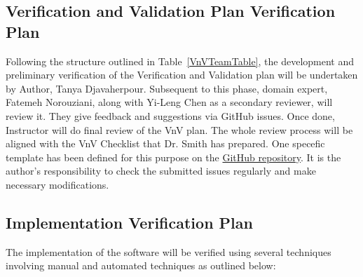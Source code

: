 \documentclass[12pt, titlepage]{article}
\begin{document}



\subsection{Verification and Validation Plan Verification Plan}\label{VnvVerPlan}

Following the structure outlined in Table~\ref{VnVTeamTable}, the development and preliminary verification of 
the Verification and Validation plan will be undertaken by Author, Tanya Djavaherpour. 
Subsequent to this phase, domain expert, Fatemeh Norouziani, along with 
Yi-Leng Chen as a secondary reviewer, will review it. 
They give feedback and suggestions via GitHub issues. 
Once done, Instructor will do final review of the VnV plan.
The whole review process will be aligned with the 
VnV Checklist \citep{VnV-Checklist} that Dr. Smith has prepared. 
One specefic template has been defined for this purpose on the 
\href{https://github.com/tanya-jp/ANN-CAS741}{GitHub repository}.
It is the author's responsibility to check the submitted issues regularly 
and make necessary modifications.




\subsection{Implementation Verification Plan}\label{ImplementationVerPlan}

The implementation of the software will be verified using several techniques
involving manual and automated techniques as outlined below:
\end{document}
